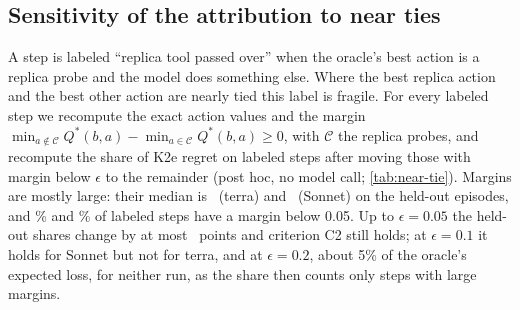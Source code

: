 \subsection{Sensitivity of the attribution to near ties}\label{app:near-tie}
A step is labeled ``replica tool passed over'' when the oracle's best action is a replica probe and the model does something else. Where the best replica action and the best other action are nearly tied this label is fragile. For every labeled step we recompute the exact action values and the margin $\min_{a\notin\mathcal C}Q^*(b,a)-\min_{a\in\mathcal C}Q^*(b,a)\ge 0$, with $\mathcal C$ the replica probes, and recompute the share of K2e regret on labeled steps after moving those with margin below $\epsilon$ to the remainder (post hoc, no model call; \cref{tab:near-tie}). Margins are mostly large: their median is \revNtTerraMedian\ (terra) and \revNtSonnetMedian\ (Sonnet) on the held-out episodes, and \revNtTerraSmall\% and \revNtSonnetSmall\% of labeled steps have a margin below 0.05. Up to $\epsilon=0.05$ the held-out shares change by at most \revNtMaxDrop\ points and criterion C2 still holds; at $\epsilon=0.1$ it holds for Sonnet but not for terra, and at $\epsilon=0.2$, about 5\% of the oracle's expected loss, for neither run, as the share then counts only steps with large margins.
\begin{table}[!htbp]
\centering
\caption{Share of K2e regret on passed-over replica steps whose oracle margin is at least $\epsilon$ (\%), and the C2 contrast (that regret minus all other regret; nested 95\% CI), on the held-out and original episodes.}
\label{tab:near-tie}
\scriptsize\setlength{\tabcolsep}{3pt}
\resizebox{\linewidth}{!}{}
\end{table}
